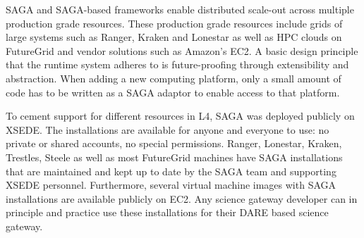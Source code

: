 \documentclass[]{svjour3}
\begin{document}
SAGA and SAGA-based frameworks enable distributed scale-out across
multiple production grade resources.  These production grade resources
include grids of large systems such as Ranger, Kraken and Lonestar as
well as HPC clouds on FutureGrid and vendor solutions such as Amazon's
EC2. A basic design principle that the runtime system adheres to is
future-proofing through extensibility and abstraction. When adding a
new computing platform, only a small amount of code has to be written
as a SAGA adaptor to enable access to that platform.

To cement support for different resources in L4, SAGA was deployed
publicly on XSEDE. The installations are available for anyone and everyone
to use: no private or shared accounts, no special permissions. Ranger,
Lonestar, Kraken, Trestles, Steele as well as most FutureGrid machines
have SAGA installations that are maintained and kept up to date by
the SAGA team and supporting XSEDE personnel. Furthermore, several virtual machine images with
SAGA installations are available publicly on EC2. Any science
gateway developer can in principle and practice use these installations
for their DARE based science gateway.


\end{document}
